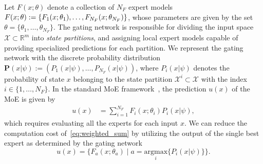 Let $F(x; \theta)$ denote a collection of $N_F$ expert models $F(x;\theta) :=
\{F_1(x; \theta_1), \dots, \\ F_{N_{F}}(x; \theta_{N_F})\}$, whose parameters
are given by the set $\theta=\{\theta_1, \dots, \theta_{N_{F}} \}$.
%
The gating network is responsible for dividing the input space $\mathcal{X}
\subset \mathbb{R}^m$ into \textit{state partitions}, and assigning local expert
models capable of providing specialized predictions for each partition.
%
%
We represent the gating network with the discrete probability distribution
$\mathbf{P}(x| \psi) := (P_1(x| \psi), \dots, P_{N_F}(x| \psi))$, where $P_i(x |
\psi)$ denotes the probability of state $x$ belonging to the state partition
$\mathcal{X}^i \subset \mathcal{X}$ with the index $i \in \{1, \dots, N_F \}$. 
%
%
%
In the standard MoE framework~\cite{jordan1994hierarchical}, the prediction
$u(x)$ of the MoE is given by
\begin{align}
  u(x) &= \sum_{i=1}^{N_F}F_i(x; \theta_i)P_i(x | \psi),
  \label{eq:weighted_sum}
\end{align}
%
which requires evaluating all the experts for each input $x$.
%
We can reduce the computation cost of~\eqref{eq:weighted_sum} by utilizing the
output of the single best expert as determined by the gating
network\cite{chen2022towards}
\begin{equation}
    u(x) = \{ F_a(x; \theta_a) \; | \; a = \underset{i}{\textrm{argmax}} \{ P_i(x | \psi) \} \}.
  \label{eq:best_expert_prediction}
\end{equation}
%

